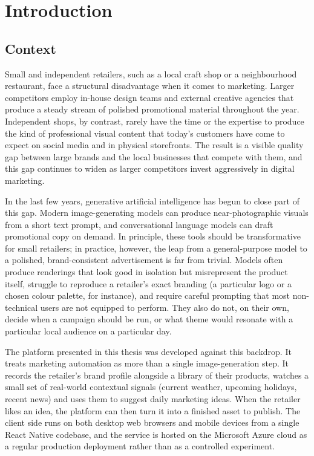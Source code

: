 \chapter{Introduction}
\label{chap:introduction}

\section{Context}

Small and independent retailers, such as a local craft shop or a neighbourhood restaurant, face a structural disadvantage when it comes to marketing. Larger competitors employ in-house design teams and external creative agencies that produce a steady stream of polished promotional material throughout the year. Independent shops, by contrast, rarely have the time or the expertise to produce the kind of professional visual content that today's customers have come to expect on social media and in physical storefronts. The result is a visible quality gap between large brands and the local businesses that compete with them, and this gap continues to widen as larger competitors invest aggressively in digital marketing.

In the last few years, generative artificial intelligence has begun to close part of this gap. Modern image-generating models can produce near-photographic visuals from a short text prompt, and conversational language models can draft promotional copy on demand. In principle, these tools should be transformative for small retailers; in practice, however, the leap from a general-purpose model to a polished, brand-consistent advertisement is far from trivial. Models often produce renderings that look good in isolation but misrepresent the product itself, struggle to reproduce a retailer's exact branding (a particular logo or a chosen colour palette, for instance), and require careful prompting that most non-technical users are not equipped to perform. They also do not, on their own, decide when a campaign should be run, or what theme would resonate with a particular local audience on a particular day.

The platform presented in this thesis was developed against this backdrop. It treats marketing automation as more than a single image-generation step. It records the retailer's brand profile alongside a library of their products, watches a small set of real-world contextual signals (current weather, upcoming holidays, recent news) and uses them to suggest daily marketing ideas. When the retailer likes an idea, the platform can then turn it into a finished asset to publish. The client side runs on both desktop web browsers and mobile devices from a single React Native codebase, and the service is hosted on the Microsoft Azure cloud as a regular production deployment rather than as a controlled experiment.

